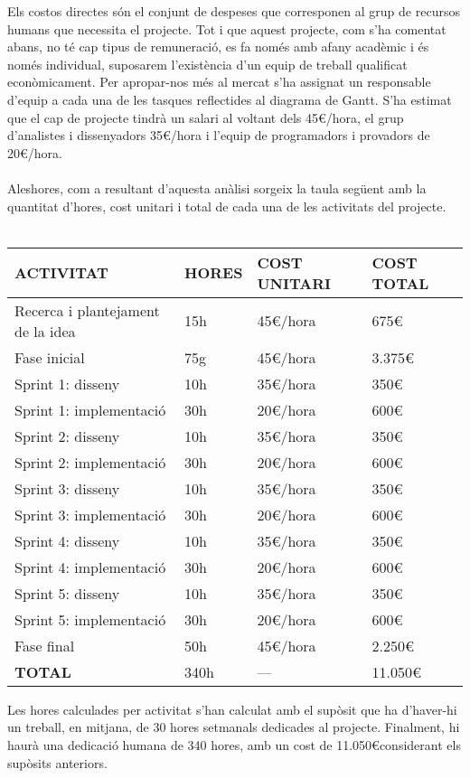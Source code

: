 Els costos directes són el conjunt de despeses que corresponen al grup de recursos humans que necessita el projecte. Tot i que aquest projecte, com s’ha comentat abans, no té cap tipus de remuneració, es fa només amb afany acadèmic i és només individual, suposarem l’existència d’un equip de treball qualificat econòmicament. Per apropar-nos més al mercat s’ha assignat un responsable d’equip a cada una de les tasques reflectides al diagrama de Gantt. S’ha estimat que el cap de projecte tindrà un salari al voltant dels 45\euro/hora, el grup d’analistes i dissenyadors 35\euro/hora i l’equip de programadors i provadors de 20\euro/hora.
\\\\
Aleshores, com a resultant d’aquesta anàlisi sorgeix la taula següent amb la quantitat d’hores, cost unitari i total de cada una de les activitats del projecte.
\\\\
\begin{center}
    \begin{tabular}{ | l | l | l | l |}
    \hline
	\textbf{ACTIVITAT}&\textbf{HORES}&\textbf{COST UNITARI}&\textbf{COST TOTAL} 		\\ \hline
    Recerca i plantejament de la idea 	& 15h 		& 45\euro/hora	& 675\euro			\\ \hline
    Fase inicial					 	& 75g 		& 45\euro/hora	& 3.375\euro		\\ \hline
    Sprint 1: disseny				 	& 10h 		& 35\euro/hora	& 350\euro			\\ \hline
    Sprint 1: implementació			 	& 30h 		& 20\euro/hora	& 600\euro			\\ \hline
	Sprint 2: disseny				 	& 10h 		& 35\euro/hora	& 350\euro			\\ \hline
    Sprint 2: implementació			 	& 30h 		& 20\euro/hora	& 600\euro			\\ \hline
    Sprint 3: disseny				 	& 10h 		& 35\euro/hora	& 350\euro			\\ \hline
    Sprint 3: implementació			 	& 30h 		& 20\euro/hora	& 600\euro			\\ \hline
    Sprint 4: disseny				 	& 10h 		& 35\euro/hora	& 350\euro			\\ \hline
   	Sprint 4: implementació			 	& 30h 		& 20\euro/hora	& 600\euro			\\ \hline
    Sprint 5: disseny				 	& 10h 		& 35\euro/hora	& 350\euro			\\ \hline
    Sprint 5: implementació			 	& 30h 		& 20\euro/hora	& 600\euro			\\ \hline
    Fase final						 	& 50h 		& 45\euro/hora	& 2.250\euro		\\ \hline
    \textbf{TOTAL}					 	& 340h 		& ---			& 11.050\euro		\\ 
    \hline
    \end{tabular}
\end{center}
Les hores calculades per activitat s’han calculat amb el supòsit que ha d’haver-hi un treball, en mitjana, de 30 hores setmanals dedicades al projecte. Finalment, hi haurà una dedicació humana de 340 hores, amb un cost de 11.050\euro\space considerant els supòsits anteriors.

